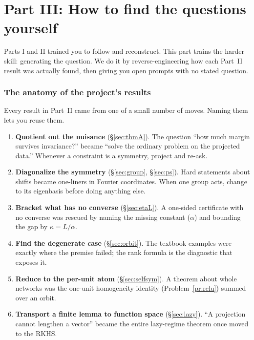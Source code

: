 \documentclass[11pt]{article}
\theoremstyle{plain}
\theoremstyle{definition}
\theoremstyle{remark}
\begin{document}
\part*{Part III: How to find the questions yourself}

Parts I and II trained you to follow and reconstruct. This part trains the harder skill: generating the question.
We do it by reverse-engineering how each Part~II result was actually found, then giving you open prompts with no
stated question.

\section{The anatomy of the project's results}

Every result in Part~II came from one of a small number of moves. Naming them lets you reuse them.

\begin{enumerate}[leftmargin=1.6em]
\item \textbf{Quotient out the nuisance} (\S\ref{sec:thmA}). The question ``how much margin survives invariance?'' became
``solve the ordinary problem on the projected data.'' Whenever a constraint is a symmetry, project and re-ask.
\item \textbf{Diagonalize the symmetry} (\S\ref{sec:group}, \S\ref{sec:ps}). Hard statements about shifts became one-liners
in Fourier coordinates. When one group acts, change to its eigenbasis before doing anything else.
\item \textbf{Bracket what has no converse} (\S\ref{sec:etaL}). A one-sided certificate with no converse was rescued by
naming the missing constant ($\alpha$) and bounding the gap by $\kappa=L/\alpha$.
\item \textbf{Find the degenerate case} (\S\ref{sec:orbit}). The textbook examples were exactly where the premise failed;
the rank formula is the diagnostic that exposes it.
\item \textbf{Reduce to the per-unit atom} (\S\ref{sec:selfsym}). A theorem about whole networks was the one-unit
homogeneity identity (Problem~\ref{pr:relu}) summed over an orbit.
\item \textbf{Transport a finite lemma to function space} (\S\ref{sec:lazy}). ``A projection cannot lengthen a vector''
became the entire lazy-regime theorem once moved to the RKHS.
\end{enumerate}
\end{document}
